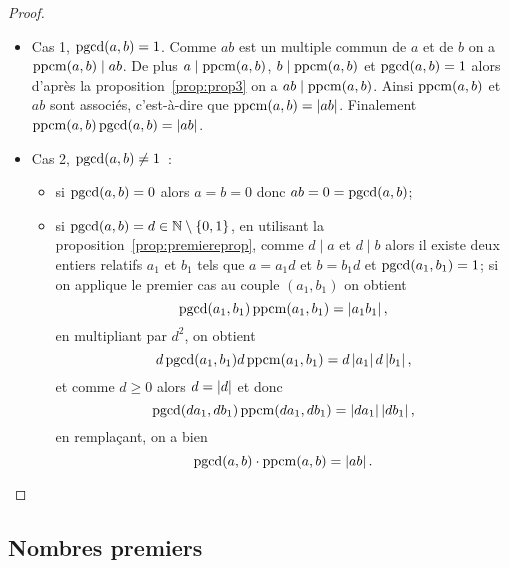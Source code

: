 \begin{proof}
  \begin{itemize}
    \item Cas 1, \(\operatorname{pgcd}(a,b)=1\). Comme \(ab\) est un multiple commun de \(a\) 
      et de \(b\) on a \(\operatorname{ppcm}(a,b) \mid ab\). De plus \(a \mid \operatorname{ppcm}(a,b)\), 
      \(b \mid \operatorname{ppcm}(a,b)\) et \(\operatorname{pgcd}(a,b)=1\) alors d'après la proposition~\ref{prop:prop3} on a \(ab \mid \operatorname{ppcm}(a,b)\). Ainsi \(\operatorname{ppcm}(a,b)\) et 
      \(ab\) sont associés, c'est-à-dire que \(\operatorname{ppcm}(a,b)=\left\lvert ab\right\rvert\). Finalement  
      \(\operatorname{ppcm}(a,b)\operatorname{pgcd}(a,b)=\left\lvert ab\right\rvert\).
    \item Cas 2, \(\operatorname{pgcd}(a,b) \neq 1\)~:
      \begin{itemize}
        \item si \(\operatorname{pgcd}(a,b) = 0\) alors \(a=b=0\) donc \(ab=0=\operatorname{pgcd}(a,b)\);
        \item si \(\operatorname{pgcd}(a,b)=d \in \mathbb{N}\setminus\{0,1\}\), en utilisant la 
          proposition~\ref{prop:premiereprop}, comme \(d  \mid a\) et \(d \mid b\) alors il 
          existe deux entiers relatifs \(a_1\) et \(b_1\) tels que \(a=a_1 d\) 
          et \(b=b_1d\) et \(\operatorname{pgcd}(a_1,b_1)=1\); si on applique le premier cas 
          au couple \((a_1,b_1)\) on obtient
          \begin{equation}
            \operatorname{pgcd}(a_1,b_1) \operatorname{ppcm}(a_1,b_1) = \left\lvert a_1b_1\right\rvert,
          \end{equation}
          en multipliant par \(d^2\), on obtient
          \begin{equation}
            d\operatorname{pgcd}(a_1,b_1) d\operatorname{ppcm}(a_1,b_1) = d\left\lvert a_1\right\rvert d\left\lvert b_1\right\rvert,
          \end{equation}
          et comme \(d\geqslant 0\) alors \(d=\left\lvert d\right\rvert\) et donc    
          \begin{equation}
            \operatorname{pgcd}(da_1,db_1) \operatorname{ppcm}(da_1,db_1) = \left\lvert da_1\right\rvert \left\lvert db_1\right\rvert,
          \end{equation}
          en remplaçant, on a bien
          \begin{equation}
            \operatorname{pgcd}(a,b) \cdot \operatorname{ppcm}(a,b)= \left\lvert ab\right\rvert.
          \end{equation}
      \end{itemize}
  \end{itemize}
\end{proof}

\subsection{Nombres premiers}

